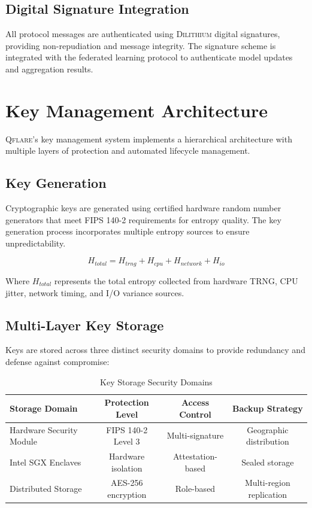 \documentclass[12pt,a4paper,twoside]{book}
\newcommand{\qflare}{\textsc{Qflare}}
\newcommand{\dilithium}{\textsc{Dilithium}}
\begin{document}
\subsection{Digital Signature Integration}
\label{subsec:digital-signatures}

All protocol messages are authenticated using \dilithium{} digital signatures, providing non-repudiation and message integrity. The signature scheme is integrated with the federated learning protocol to authenticate model updates and aggregation results.

\section{Key Management Architecture}
\label{sec:key-management}

\qflare{}'s key management system implements a hierarchical architecture with multiple layers of protection and automated lifecycle management.

\subsection{Key Generation}
\label{subsec:key-generation}

Cryptographic keys are generated using certified hardware random number generators that meet FIPS 140-2 requirements for entropy quality. The key generation process incorporates multiple entropy sources to ensure unpredictability.

\begin{equation}
\label{eq:entropy-collection}
H_{total} = H_{trng} + H_{cpu} + H_{network} + H_{io}
\end{equation}

Where $H_{total}$ represents the total entropy collected from hardware TRNG, CPU jitter, network timing, and I/O variance sources.

\subsection{Multi-Layer Key Storage}
\label{subsec:key-storage}

Keys are stored across three distinct security domains to provide redundancy and defense against compromise:

\begin{table}[htbp]
\centering
\caption{Key Storage Security Domains}
\label{tab:key-storage}
\begin{tabular}{@{}lccc@{}}
\toprule
Storage Domain & Protection Level & Access Control & Backup Strategy \\
\midrule
Hardware Security Module & FIPS 140-2 Level 3 & Multi-signature & Geographic distribution \\
Intel SGX Enclaves & Hardware isolation & Attestation-based & Sealed storage \\
Distributed Storage & AES-256 encryption & Role-based & Multi-region replication \\
\bottomrule
\end{tabular}
\end{table}
\end{document}
